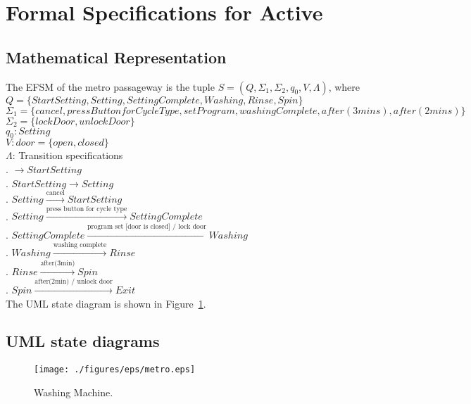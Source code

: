 \newpage
\section{Formal Specifications for Active}

\subsection{Mathematical Representation}

\noindent The EFSM of the metro passageway is the tuple $S = (Q, \Sigma_1, \Sigma_2, q_0, V, \Lambda)$, where\\

\noindent $Q = \{Start Setting, Setting, Setting Complete, Washing, Rinse, Spin\}$\\
\noindent $\Sigma_1 = \{cancel, press Button for Cycle Type, set Program, washing Complete, after(3 mins), after(2 mins)\}$\\
\noindent $\Sigma_2 = \{lock Door, unlock Door\}$\\
\noindent $q_0: Setting$\\
\noindent $V: door = \{open, closed\}$\\
\noindent $\Lambda$: Transition specifications\\
. $\rightarrow Start Setting$\\
. $Start Setting \rightarrow Setting$\\
. $Setting \xrightarrow {\text {cancel}} Start Setting$\\
. $Setting \xrightarrow {\text {press button for cycle type}} Setting Complete$\\
. $Setting Complete \xrightarrow {\text {program set [door is closed] / lock door}} Washing$\\
. $Washing \xrightarrow {\text {washing complete}} Rinse$\\
. $Rinse \xrightarrow {\text {after(3min)}} Spin$\\
. $Spin \xrightarrow {\text {after(2min) / unlock door}} Exit$\\

\noindent The UML state diagram is shown in Figure~\ref{fig:Active}.

\newpage

\subsection{UML state diagrams}

\begin{figure}[h!]
	\centering
		\texttt{[image: ./figures/eps/metro.eps]}
		  \caption{Washing Machine.}
  \label{fig:Active}
\end{figure}